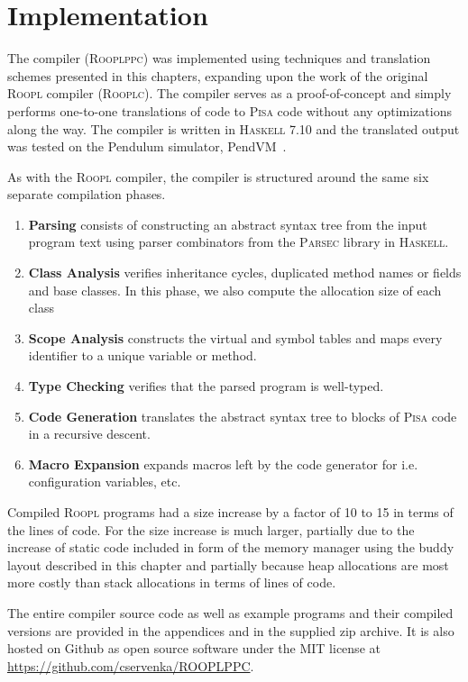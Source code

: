 \section{Implementation}
\label{sec:implementation}
The \rooplpp compiler (\textsc{Rooplppc}) was implemented using techniques and translation schemes presented in this chapters, expanding upon the work of the original \textsc{Roopl} compiler (\textsc{Rooplc}). The compiler serves as a proof-of-concept and simply performs one-to-one translations of \rooplpp code to \textsc{Pisa} code without any optimizations along the way. The compiler is written in \textsc{Haskell} 7.10 and the translated output was tested on the Pendulum simulator, PendVM~\cite{cr:pendvm}. 

As with the \textsc{Roopl} compiler, the \rooplpp compiler is structured around the same six separate compilation phases.
\begin{enumerate}
    \item \textbf{Parsing} consists of constructing an abstract syntax tree from the input program text using parser combinators from the \textsc{Parsec} library in \textsc{Haskell}.
    \item \textbf{Class Analysis} verifies inheritance cycles, duplicated method names or fields and base classes. In this phase, we also compute the allocation size of each class
    \item \textbf{Scope Analysis} constructs the virtual and symbol tables and maps every identifier to a unique variable or method.
    \item \textbf{Type Checking} verifies that the parsed program is well-typed.
    \item \textbf{Code Generation} translates the abstract syntax tree to blocks of \textsc{Pisa} code in a recursive descent.
    \item \textbf{Macro Expansion} expands macros left by the code generator for i.e. configuration variables, etc.
\end{enumerate}

Compiled \textsc{Roopl} programs had a size increase by a factor of 10 to 15 in terms of the lines of code. For \rooplpp the size increase is much larger, partially due to the increase of static code included in form of the memory manager using the buddy layout described in this chapter and partially because heap allocations are most more costly than stack allocations in terms of lines of code.

The entire compiler source code as well as example programs and their compiled versions are provided in the appendices and in the supplied zip archive. It is also hosted on Github as open source software under the MIT license at \url{https://github.com/cservenka/ROOPLPPC}.
